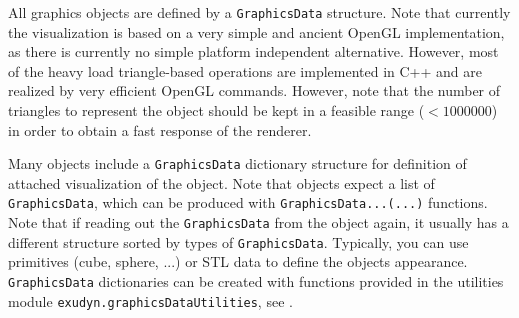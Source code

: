 \newpage %
All graphics objects are defined by a \texttt{GraphicsData} structure. %
Note that currently the visualization is based on a very simple and ancient OpenGL implementation, as there is currently no simple platform independent alternative. However, most of the heavy load triangle-based operations are implemented in C++ and are realized by very efficient OpenGL commands. However, note that the number of triangles to represent the object should be kept in a feasible range ($<1000000$) in order to obtain a fast response of the renderer.

Many objects include a \texttt{GraphicsData} dictionary structure for definition of attached visualization of the object.
Note that objects expect a list of \texttt{GraphicsData}, which can be produced with \texttt{GraphicsData...(...)} functions. Note that if reading out the \texttt{GraphicsData} from the object again, it usually has a different structure sorted by types of \texttt{GraphicsData}.
Typically, you can use primitives (cube, sphere, ...) or \ac{STL} data to define the objects appearance.
\texttt{GraphicsData} dictionaries can be created with functions provided in the utilities module \texttt{exudyn.graphicsDataUtilities}, see .

